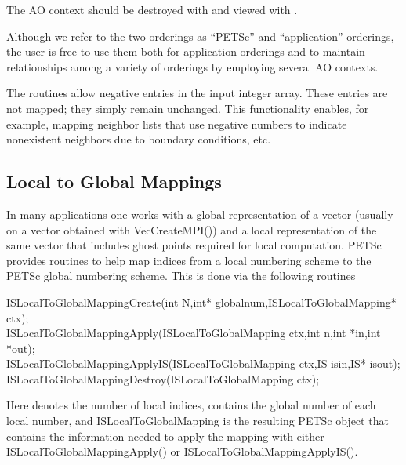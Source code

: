   
The AO context should be destroyed with 
and viewed with .

Although we refer to the two orderings as ``PETSc'' and
``application'' orderings, the user is free to use them both for
application orderings and to maintain relationships among a variety of
orderings by employing several AO contexts.

The  routines allow negative entries in the input
integer array. These entries are not mapped; they simply remain
unchanged.  This functionality enables, for example, mapping neighbor
lists that use negative numbers to indicate nonexistent neighbors due
to boundary conditions, etc.

\subsection{Local to Global Mappings}
\label{sec_islocaltoglobalmapping}
 

In many applications one works with a global representation of a vector
(usually on a vector obtained with VecCreateMPI()) 
and a local representation of the same vector that includes ghost points 
required for local computation.  
 
PETSc provides routines to help map indices from a local numbering scheme to 
the PETSc global numbering scheme. This is done via the following routines
\begin{tabbing}
  ISLocalToGlobalMappingCreate(int N,int* globalnum,ISLocalToGlobalMapping* ctx);\\
  ISLocalToGlobalMappingApply(ISLocalToGlobalMapping ctx,int n,int *in,int *out);\\
  ISLocalToGlobalMappingApplyIS(ISLocalToGlobalMapping ctx,IS isin,IS* isout);\\
  ISLocalToGlobalMappingDestroy(ISLocalToGlobalMapping ctx);
\end{tabbing}
 
 
Here  denotes the number of local indices,  contains the
global number of each local number, and ISLocalToGlobalMapping is the 
resulting PETSc object that contains the information needed to apply the mapping with 
either ISLocalToGlobalMappingApply() or 
ISLocalToGlobalMappingApplyIS().  

